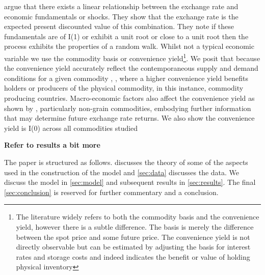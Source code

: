 \cite{engel} argue that there exists a linear relationship between the exchange rate and economic fundamentals or shocks. They show that the  exchange rate is the expected
present discounted value of this combination. They note if these fundamentals are of I(1) or exhibit a unit root or close to a unit root then the process exhibits the properties of a random walk. Whilst not a typical economic variable we use the commodity basis or convenience yield\footnote{The literature widely refers to both the commodity basis and the convenience yield, however there is a subtle difference. The basis is merely the difference between the spot price and some future price. The convenience yield is not directly observable but can be estimated by adjusting the basis for interest rates and storage costs and indeed indicates the benefit or value of holding physical inventory}. We posit that because the convenience yield accurately reflect the contemporaneous supply and demand conditions for a given commodity \cite{imfsupplyshock}, \cite{gorton2007}, where a higher convenience yield benefits holders or producers of the physical commodity, in this instance, commodity producing countries. Macro-economic factors also affect the convenience yield as shown by \cite{cyielddetermin}, particularly non-grain commodities, embodying further information that may determine future exchange rate returns. We also show the convenience yield is I(0) across all commodities studied

\textbf{Refer to results a bit more}

The paper is structured as follows.  discusses the theory of some of the aspects used in the construction of the model and \autoref{sec:data} discusses the data. We discuss the model in \autoref{sec:model} and subsequent results in \autoref{sec:results}. The final \autoref{sec:conclusion} is reserved for further commentary and a conclusion.





